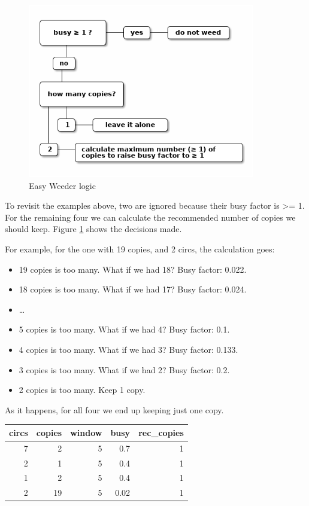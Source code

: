 \documentclass[11pt]{article}
\begin{document}
\begin{figure}[htbp]
\centering
\includegraphics[height=3in]{logic-flow.png}
\caption{\label{fig:orgc61901c}
Easy Weeder logic}
\end{figure}

To revisit the examples above, two are ignored because their busy factor is >= 1.  For the remaining four we can calculate the recommended number of copies we should keep.  Figure \ref{fig:orgc61901c} shows the decisions made.

For example, for the one with 19 copies, and 2 circs, the calculation goes:

\begin{itemize}
\item 19 copies is too many.  What if we had 18? Busy factor: 0.022.
\item 18 copies is too many.  What if we had 17? Busy factor: 0.024.
\item …
\item 5 copies is too many.  What if we had 4?  Busy factor: 0.1.
\item 4 copies is too many.  What if we had 3?  Busy factor: 0.133.
\item 3 copies is too many.  What if we had 2?  Busy factor: 0.2.
\item 2 copies is too many. Keep 1 copy.
\end{itemize}

As it happens, for all four we end up keeping just one copy.

\begin{center}
\begin{tabular}{rrrrr}
circs & copies & window & busy & rec\_copies\\
\hline
7 & 2 & 5 & 0.7 & 1\\
2 & 1 & 5 & 0.4 & 1\\
1 & 2 & 5 & 0.4 & 1\\
2 & 19 & 5 & 0.02 & 1\\
\end{tabular}
\end{center}
\end{document}
